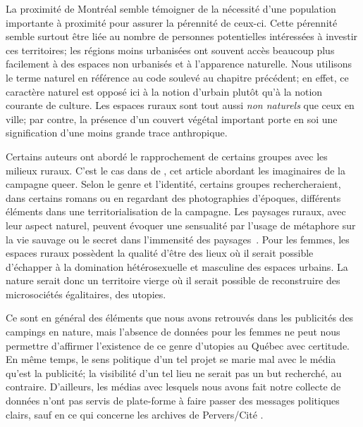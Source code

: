 La proximité de Montréal semble témoigner de la nécessité d'une population importante à proximité pour assurer la pérennité de ceux-ci.
Cette pérennité semble surtout être liée au nombre de personnes potentielles intéressées à investir ces territoires; les régions moins urbanisées ont souvent accès beaucoup plus facilement à des espaces non urbanisés et à l'apparence naturelle.
Nous utilisons le terme naturel en référence au code soulevé au chapitre précédent; en effet, ce caractère naturel est opposé ici à la notion d'urbain plutôt qu'à la notion courante de culture.
Les espaces ruraux sont tout aussi \emph{non naturels} que ceux en ville; par contre, la présence d'un couvert végétal important porte en soi une signification d'une moins grande trace anthropique.

Certains auteurs ont abordé le rapprochement de certains groupes \lgbt{} avec les milieux ruraux.
C'est le cas dans  de \citeauthor{Bell1995a}, cet article abordant les imaginaires de la campagne queer.
Selon le genre et l'identité, certains groupes rechercheraient, dans certains romans ou en regardant des photographies d'époques, différents éléments dans une territorialisation de la campagne.
Les paysages ruraux, avec leur aspect naturel, peuvent évoquer une sensualité par l'usage de métaphore sur la vie sauvage ou le secret dans l'immensité des paysages~\citep[114]{Bell1995a}.
Pour les femmes, les espaces ruraux possèdent la qualité d'être des lieux où il serait possible d'échapper à la domination hétérosexuelle et masculine des espaces urbains.
La nature serait donc un territoire vierge où il serait possible de reconstruire des microsociétés égalitaires, des utopies.

Ce sont en général des éléments que nous avons retrouvés dans les publicités des campings en nature, mais l'absence de données pour les femmes ne peut nous permettre d'affirmer l'existence de ce genre d'utopies au Québec avec certitude.
En même temps, le sens politique d'un tel projet se marie mal avec le média qu'est la publicité; la visibilité d'un tel lieu ne serait pas un but recherché, au contraire.
D'ailleurs, les médias \lgbt{} avec lesquels nous avons fait notre collecte de données n'ont pas servis de plate-forme à faire passer des messages politiques clairs, sauf en ce qui concerne les archives de Pervers/Cité .

